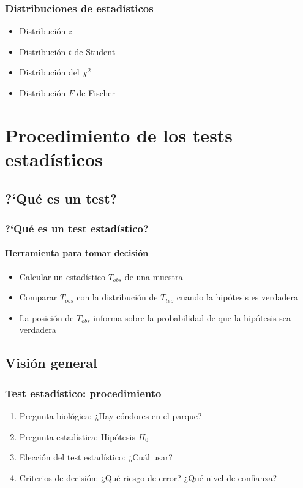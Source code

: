 \documentclass[gray,handout,mathserif]{beamer}
\begin{document}
\begin{frame}[label=otherdist2]
   \frametitle{Distribuciones de estad\'isticos}
   \begin{itemize}
      \item Distribuci\'on $z$ 
      \item Distribuci\'on $t$ de Student
      \item Distribuci\'on del $\chi^2$ 
      \item Distribuci\'on $F$ de Fischer
   \end{itemize}
\end{frame}%




\section[Procedimiento]{Procedimiento de los tests estad\'isticos}

\subsection[?`Qu\'e es un test?]{?`Qu\'e es un test?}

\begin{frame}[label=testdef]
   \frametitle{?`Qu\'e es un test estad\'istico?}
   \framesubtitle{Herramienta para tomar decisi\'on}
   \begin{itemize}
      \item Calcular un estad\'istico $T_{obs}$ de una muestra
      \item Comparar $T_{obs}$ con la distribuci\'on de $T_{teo}$ cuando la hip\'otesis es verdadera
      \item La posici\'on de $T_{obs}$ informa sobre la probabilidad de que la hip\'otesis sea verdadera
   \end{itemize}
\end{frame}%


\subsection[Generalidades]{Visi\'on general}

\begin{frame}[label=testproc1]
   \frametitle{Test estad\'istico: procedimiento}
   \begin{enumerate}[<+-| handout:1>]
      \item Pregunta biol\'ogica: ¿Hay c\'ondores en el parque?
      \item Pregunta estad\'istica: Hip\'otesis $H_0$
      \item Elecci\'on del test estad\'istico: ¿Cu\'al usar?
      \item Criterios de decisi\'on: ¿Qu\'e riesgo de error? ¿Qu\'e nivel de confianza?
   \end{enumerate}
\end{frame}%
\end{document}
